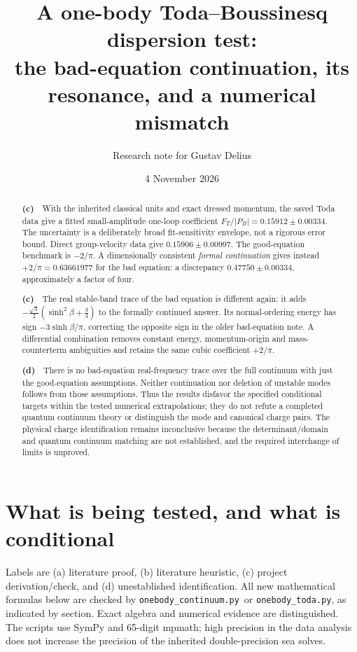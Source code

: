\documentclass[11pt,a4paper]{article}
\title{A one-body Toda--Boussinesq dispersion test:\\
the bad-equation continuation, its resonance, and a numerical mismatch}
\author{Research note for Gustav Delius}
\date{4 November 2026}
\newcommand{\Lc}{\textbf{(c)}\ }
\newcommand{\Ld}{\textbf{(d)}\ }
\newcommand{\CC}{\texttt{onebody\_\allowbreak continuum.py}}
\newcommand{\TT}{\texttt{onebody\_\allowbreak toda.py}}
\begin{document}
\maketitle
\begin{abstract}
\Lc\ With the inherited classical units and exact dressed momentum, the
saved Toda data give a fitted small-amplitude one-loop coefficient
$F_T/|P_B|=0.15912\pm0.00334$. The uncertainty is a deliberately broad
fit-sensitivity envelope, not a rigorous error bound. Direct group-velocity
data give $0.15906\pm0.00997$. The good-equation benchmark is $-2/\pi$.
A dimensionally consistent \emph{formal continuation} gives instead
$+2/\pi=0.63661977$ for the bad equation: a discrepancy
$0.47750\pm0.00334$, approximately a factor of four.

\Lc\ The real stable-band trace of the bad equation is different again:
it adds $-\frac{\sqrt3}{2}(\sinh^2\beta+\frac34)$ to the formally continued
answer. Its normal-ordering energy has sign $-3\sinh\beta/\pi$, correcting
the opposite sign in the older bad-equation note. A differential combination
removes constant energy, momentum-origin and mass-counterterm ambiguities
and retains the same cubic coefficient $+2/\pi$.

\Ld\ There is no bad-equation real-frequency trace over the full continuum
with just the good-equation assumptions. Neither continuation nor deletion
of unstable modes follows from those assumptions. Thus the results disfavor
the specified conditional targets within the tested numerical extrapolations;
they do not refute a completed quantum continuum theory or distinguish the
mode and canonical charge pairs. The physical charge identification remains
inconclusive because the determinant/domain and quantum continuum matching
are not established, and the required interchange of limits is unproved.
\end{abstract}

\section{What is being tested, and what is conditional}
Labels are (a) literature proof, (b) literature heuristic, (c) project
derivation/check, and (d) unestablished identification. All new mathematical
formulas below are checked by \CC\ or \TT, as indicated by section.
Exact algebra and numerical evidence are distinguished. The scripts use
SymPy and 65-digit mpmath; high precision in the data analysis does not
increase the precision of the inherited double-precision sea solves.
\end{document}
